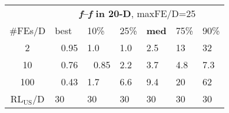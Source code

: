 \begin{tabular}{c|llllll}
 & \multicolumn{6}{|c}{\textbf{\textit{f}\raisebox{-0.35ex}{2}--\textit{f}\raisebox{-0.35ex}{24} in 20-D}, maxFE/D=25}\\
\#FEs/D & best & 10\% & 25\% & \textbf{med} & 75\% & 90\%\\
2 & ~\,0.95 & \hspace*{1ex}1.0 & \hspace*{1ex}1.0 & \hspace*{1ex}2.5 & 13 & 32\\
10 & ~\,0.76 & ~\,0.85 & \hspace*{1ex}2.2 & \hspace*{1ex}3.7 & \hspace*{1ex}4.8 & \hspace*{1ex}7.3\\
100 & ~\,0.43 & \hspace*{1ex}1.7 & \hspace*{1ex}6.6 & \hspace*{1ex}9.4 & 20 & 62\\
$\text{RL}_{\text{US}}$/D & 30 & 30 & 30 & 30 & 30 & 30
\end{tabular}

